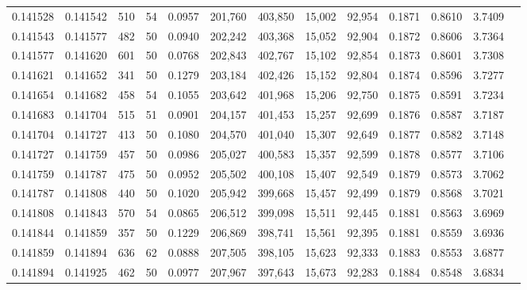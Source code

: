 \begin{tabular}{rrrrrrrrrrrrr}
0.141528 & 0.141542 &   510 &  54 &                                     0.0957 & 201,760 & 403,850 &  15,002 &  92,954 & 0.1871 & 0.8610 & 3.7409 \\
0.141543 & 0.141577 &   482 &  50 &                                     0.0940 & 202,242 & 403,368 &  15,052 &  92,904 & 0.1872 & 0.8606 & 3.7364 \\
0.141577 & 0.141620 &   601 &  50 &                                     0.0768 & 202,843 & 402,767 &  15,102 &  92,854 & 0.1873 & 0.8601 & 3.7308 \\
0.141621 & 0.141652 &   341 &  50 &                                     0.1279 & 203,184 & 402,426 &  15,152 &  92,804 & 0.1874 & 0.8596 & 3.7277 \\
0.141654 & 0.141682 &   458 &  54 &                                     0.1055 & 203,642 & 401,968 &  15,206 &  92,750 & 0.1875 & 0.8591 & 3.7234 \\
0.141683 & 0.141704 &   515 &  51 &                                     0.0901 & 204,157 & 401,453 &  15,257 &  92,699 & 0.1876 & 0.8587 & 3.7187 \\
0.141704 & 0.141727 &   413 &  50 &                                     0.1080 & 204,570 & 401,040 &  15,307 &  92,649 & 0.1877 & 0.8582 & 3.7148 \\
0.141727 & 0.141759 &   457 &  50 &                                     0.0986 & 205,027 & 400,583 &  15,357 &  92,599 & 0.1878 & 0.8577 & 3.7106 \\
0.141759 & 0.141787 &   475 &  50 &                                     0.0952 & 205,502 & 400,108 &  15,407 &  92,549 & 0.1879 & 0.8573 & 3.7062 \\
0.141787 & 0.141808 &   440 &  50 &                                     0.1020 & 205,942 & 399,668 &  15,457 &  92,499 & 0.1879 & 0.8568 & 3.7021 \\
0.141808 & 0.141843 &   570 &  54 &                                     0.0865 & 206,512 & 399,098 &  15,511 &  92,445 & 0.1881 & 0.8563 & 3.6969 \\
0.141844 & 0.141859 &   357 &  50 &                                     0.1229 & 206,869 & 398,741 &  15,561 &  92,395 & 0.1881 & 0.8559 & 3.6936 \\
0.141859 & 0.141894 &   636 &  62 &                                     0.0888 & 207,505 & 398,105 &  15,623 &  92,333 & 0.1883 & 0.8553 & 3.6877 \\
0.141894 & 0.141925 &   462 &  50 &                                     0.0977 & 207,967 & 397,643 &  15,673 &  92,283 & 0.1884 & 0.8548 & 3.6834 \\

\end{tabular}
